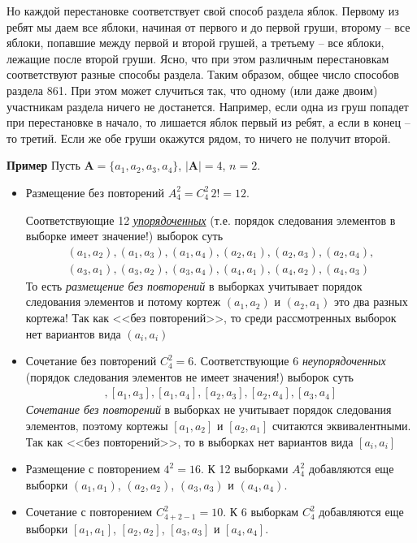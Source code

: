 \documentclass[%
	11pt,
	a4paper,
	utf8,
		]{article}
\begin{document}
Но каждой перестановке соответствует свой способ раздела яблок. Первому из ребят мы даем все яблоки, начиная от первого и до первой груши, второму -- все яблоки, попавшие между первой и второй грушей, а третьему -- все яблоки, лежащие после второй груши. Ясно, что при этом различным перестановкам соответствуют разные способы раздела. Таким образом, общее число способов раздела 861. При этом может случиться так, что одному (или даже двоим) участникам раздела ничего не достанется. Например, если одна из груш попадет при перестановке в начало, то лишается яблок первый из ребят, а если в конец -- то третий. Если же обе груши окажутся рядом, то ничего не получит второй. 

\vspace*{2mm}
\textbf{Пример} \cite[]{shiryaev:prob-2013} Пусть $ \mathbf{A} = \{a_1, a_2, a_3, a_4\} $, $ | \mathbf{A} | = 4 $, $ n = 2 $.

\begin{itemize}
	\item Размещение без повторений $ A_4^2 = C_4^2 \, 2! = 12 $. 
	
	Соответствующие 12 \emph{\underline{упорядоченных}} (т.е. порядок следования элементов в выборке имеет значение!) выборок суть
	\begin{align*}
		(a_1, a_2), (a_1, a_3), (a_1, a_4), (a_2, a_1), (a_2, a_3), (a_2, a_4),\\ (a_3, a_1), (a_3, a_2), (a_3, a_4), (a_4, a_1), (a_4, a_2), (a_4, a_3)
	\end{align*}
    То есть \emph{размещение без повторений} в выборках учитывает порядок следования элементов и потому кортеж $ (a_1, a_2) $ и $ (a_2, a_1) $ это два разных кортежа! Так как <<без повторений>>, то среди рассмотренных выборок нет вариантов вида $ (a_i, a_i) $
    
    \item Сочетание без повторений $ C_4^2 = 6 $. Соответствующие 6 \emph{неупорядоченных} (порядок следования элементов не имеет значения!) выборок суть
    \begin{align*}
    	[a_1, a_2], [a_1, a_3], [a_1, a_4], [a_2, a_3], [a_2, a_4], [a_3, a_4]
    \end{align*} 
    \emph{Сочетание без повторений} в выборках не учитывает порядок следования элементов, поэтому кортежы $ [a_1, a_2] $ и $ [a_2, a_1] $ считаются эквивалентными. Так как <<без повторений>>, то в выборках нет вариантов вида $ [a_i, a_i] $
    
    \item Размещение с повторением $ 4^2 = 16 $. К 12 выборками $ A_4^2 $ добавляются еще выборки $ (a_1, a_1) $, $ (a_2, a_2) $, $ (a_3, a_3) $ и $ (a_4, a_4) $.
    
    \item Сочетание с повторением $ C_{4 + 2 -1}^2 = 10 $. К 6 выборкам $ C_4^2 $ добавляются еще выборки $ [a_1, a_1] $, $ [a_2, a_2]$, $ [a_3, a_3] $ и $ [a_4, a_4] $.
\end{itemize}
\end{document}

